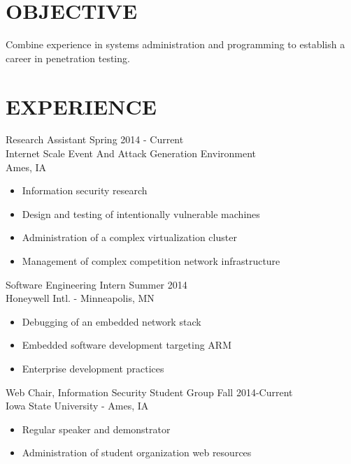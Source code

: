 \documentclass[11pt]{res} %
\begin{document}
 
 

\address{ 100 Linden Fulmer $\bullet$ Ames, IA
         50013 $\bullet$ (563) 299-3920 $\bullet$ drahos@iastate.edu}
 
\begin{resume}
                                               
\section{OBJECTIVE}
	Combine experience in systems administration and programming
	to establish a career in penetration testing.
 
\section{EXPERIENCE} 
Research Assistant \hfill Spring 2014 - Current\\
Internet Scale Event And Attack Generation Environment \\
Ames, IA 
 \begin{itemize} \itemsep -2pt
	\item Information security research
	\item Design and testing of intentionally vulnerable machines
	\item Administration of a complex virtualization cluster
	\item Management of complex competition network infrastructure
\end{itemize} 

Software Engineering Intern \hfill Summer 2014\\
Honeywell Intl. - Minneapolis, MN 
\begin{itemize} \itemsep -2pt  %
   \item Debugging of an embedded network stack
   \item Embedded software development targeting ARM
   \item Enterprise development practices
 \end{itemize}

Web Chair, Information Security Student Group  \hfill Fall 2014-Current\\
Iowa State University - Ames, IA
   \begin{itemize} \itemsep -2pt  %
   \item Regular speaker and demonstrator
   \item Administration of student organization web resources
 \end{itemize}


\end{resume}
\end{document}
